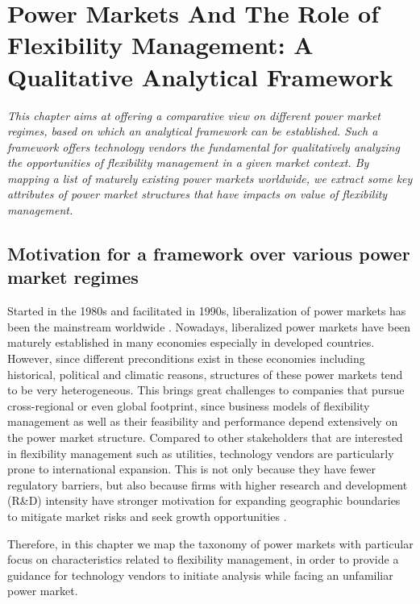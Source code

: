 \chapter{Power Markets And The Role of Flexibility Management: A Qualitative Analytical Framework}
\label{ch:market}
\textit{This chapter aims at offering a comparative view on different power market regimes, based on which an analytical framework can be established. Such a framework offers technology vendors the fundamental for qualitatively analyzing the opportunities of flexibility management in a given market context. By mapping a list of maturely existing power markets worldwide, we extract some key attributes of power market structures that have impacts on value of flexibility management.}

\section{Motivation for a framework over various power market regimes}

Started in the 1980s and facilitated in 1990s, liberalization of power markets has been the mainstream worldwide \cite{Srivastava2011,Ranci2013,Vagliasindi2013}. Nowadays, liberalized power markets have been maturely established in many economies especially in developed countries. 
However, since different preconditions exist in these economies including historical, political and climatic reasons, structures of these power markets tend to be very heterogeneous. %
This brings great challenges to companies that pursue cross-regional or even global footprint, since business models of flexibility management as well as their feasibility and performance depend extensively on the power market structure. Compared to other stakeholders that are interested in flexibility management such as utilities, technology vendors are particularly prone to international expansion. This is not only because they have fewer regulatory barriers, but also because firms with higher research and development (R\&D) intensity have stronger motivation for expanding geographic boundaries to mitigate market risks and seek growth opportunities \cite{Brouthers2007}.

Therefore, in this chapter we map the taxonomy of power markets with particular focus on characteristics related to flexibility management, in order to provide a guidance for technology vendors to initiate analysis while facing an unfamiliar power market.

